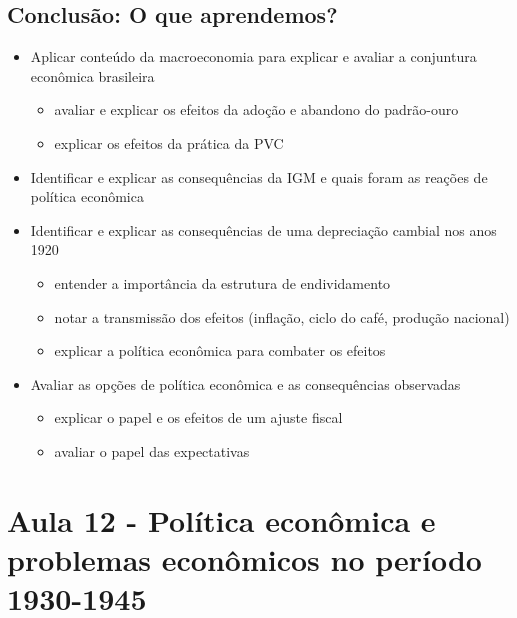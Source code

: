 \documentclass[a4paper,12pt]{article}[abntex2]
\begin{document}
\subsection{\textbf{Conclusão: O que aprendemos?}}
\begin{itemize}
    \item Aplicar conteúdo da macroeconomia para explicar e avaliar a conjuntura econômica brasileira
    \begin{itemize}
        \item avaliar e explicar os efeitos da adoção e abandono do padrão-ouro
    \end{itemize}
    \begin{itemize}
        \item  explicar os efeitos da prática da PVC
    \end{itemize}
    \item Identificar e explicar as consequências da IGM e quais foram as reações de política econômica
    \item Identificar e explicar as consequências de uma depreciação cambial nos anos 1920
    \begin{itemize}
        \item  entender a importância da estrutura de endividamento
    \end{itemize}
    \begin{itemize}
        \item notar a transmissão dos efeitos (inflação, ciclo do café, produção nacional)
    \end{itemize}
    \begin{itemize}
        \item explicar a política econômica para combater os efeitos
    \end{itemize}
    \item Avaliar as opções de política econômica e as consequências observadas
    \begin{itemize}
        \item  explicar o papel e os efeitos de um ajuste fiscal
    \end{itemize}
    \begin{itemize}
        \item avaliar o papel das expectativas
    \end{itemize}
\end{itemize}
\newpage

\section{\textbf{Aula 12 - Política econômica e problemas econômicos no período 1930-1945}}
\end{document}

